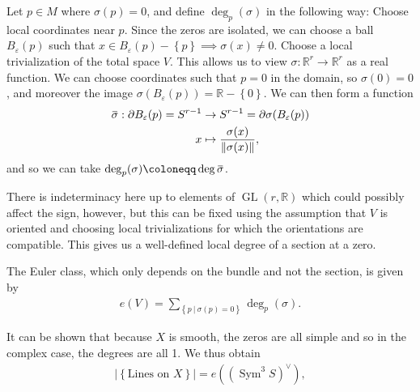\begin{definition}[Degrees]

Let \(p\in M\) where \(\sigma(p) = 0\), and define \(\deg_p(\sigma)\) in
the following way: Choose local coordinates near \(p\). Since the zeros
are isolated, we can choose a ball \(B_\varepsilon(p)\) such that
\(x\in B_\varepsilon(p) - \left\{{p}\right\} \implies \sigma(x) \neq 0\).
Choose a local trivialization of the total space \(V\). This allows us
to view \(\sigma: {\mathbb{R}}^r \to {\mathbb{R}}^r\) as a real
function. We can choose coordinates such that \(p = 0\) in the domain,
so \(\sigma(0) = 0\), and moreover the image
\(\sigma(B_\varepsilon(p)) = {\mathbb{R}}- \left\{{0}\right\}\). We can
then form a function
\begin{align*}
\mkern 1.5mu\overline{\mkern-1.5mu\sigma\mkern-1.5mu}\mkern 1.5mu: {\partial}B_\varepsilon(p) = S^{r-1} &\to S^{r-1} = {\partial}\sigma(B_\varepsilon(p)) \\
x &\mapsto \frac{\sigma(x)} {{\left\lVert {\sigma(x)} \right\rVert}},
\end{align*}
and so we can take
\(\deg_p(\sigma) \coloneqq\deg \mkern 1.5mu\overline{\mkern-1.5mu\sigma\mkern-1.5mu}\mkern 1.5mu\).

\end{definition}

\begin{remark}

There is indeterminacy here up to elements of
\(\operatorname{GL}(r, {\mathbb{R}})\) which could possibly affect the
sign, however, but this can be fixed using the assumption that \(V\) is
oriented and choosing local trivializations for which the orientations
are compatible. This gives us a well-defined local degree of a section
at a zero.

\end{remark}

\begin{definition}

The Euler class, which only depends on the bundle and not the section,
is given by
\begin{align*}
e(V) = \sum_{\left\{{p{~\mathrel{\Big|}~}\sigma(p) = 0}\right\}} \deg_p(\sigma).
\end{align*}

\end{definition}

It can be shown that because \(X\) is smooth, the zeros are all simple
and so in the complex case, the degrees are all 1. We thus obtain
\begin{align*}
{\left\lvert {\left\{{\text{Lines on } X}\right\}} \right\rvert} = e((\operatorname{Sym}^3 S)^\vee),
\end{align*}

